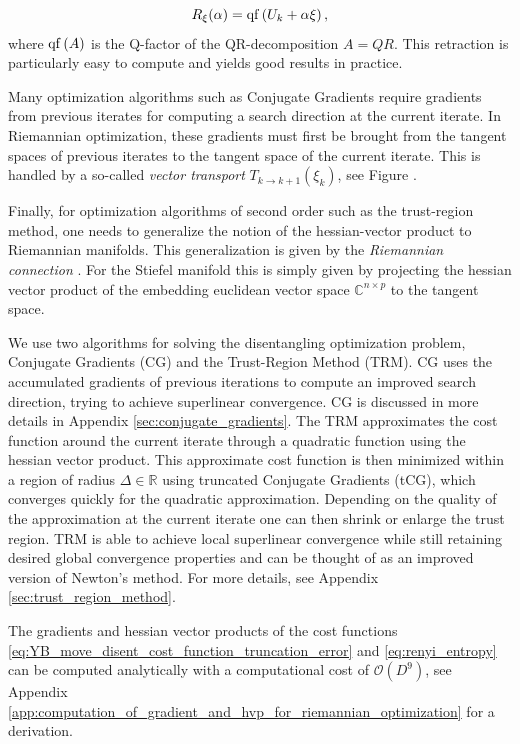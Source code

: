 \begin{equation}
	R_\xi(\alpha) = \operatorname{qf}\left(U_k + \alpha\xi\right),
\end{equation}
where $\operatorname{qf}\left(A\right)$ is the Q-factor of the QR-decomposition $A = QR$. This retraction is particularly easy to compute and yields good results in practice. \par
Many optimization algorithms such as Conjugate Gradients require gradients from previous iterates for computing a search direction at the current iterate. In Riemannian optimization, these gradients must first be brought from the tangent spaces of previous iterates to the tangent space of the current iterate. This is handled by a so-called \textit{vector transport} $T_{k\rightarrow k+1}\left(\xi_k\right)$, see Figure . \par
Finally, for optimization algorithms of second order such as the trust-region method, one needs to generalize the notion of the hessian-vector product to Riemannian manifolds. This generalization is given by the \textit{Riemannian connection} \cite{cite:optimization_on_matrix_manifolds}. For the Stiefel manifold this is simply given by projecting the hessian vector product of the embedding euclidean vector space $\mathbb{C}^{n\times p}$ to the tangent space. \par
We use two algorithms for solving the disentangling optimization problem, Conjugate Gradients (CG) and the Trust-Region Method (TRM). CG uses the accumulated gradients of previous iterations to compute an improved search direction, trying to achieve superlinear convergence. CG is discussed in more details in Appendix \ref{sec:conjugate_gradients}. The TRM approximates the cost function around the current iterate through a quadratic function using the hessian vector product. This approximate cost function is then minimized within a region of radius $\Delta\in\mathbb{R}$ using truncated Conjugate Gradients (tCG), which converges quickly for the quadratic approximation. Depending on the quality of the approximation at the current iterate one can then shrink or enlarge the trust region. TRM is able to achieve local superlinear convergence while still retaining desired global convergence properties \cite{cite:optimization_on_matrix_manifolds} and can be thought of as an improved version of Newton's method. For more details, see Appendix \ref{sec:trust_region_method}. \par
The gradients and hessian vector products of the cost functions \eqref{eq:YB_move_disent_cost_function_truncation_error} and \eqref{eq:renyi_entropy} can be computed analytically with a computational cost of $\mathcal{O}(D^9)$, see Appendix \ref{app:computation_of_gradient_and_hvp_for_riemannian_optimization} for a derivation.
